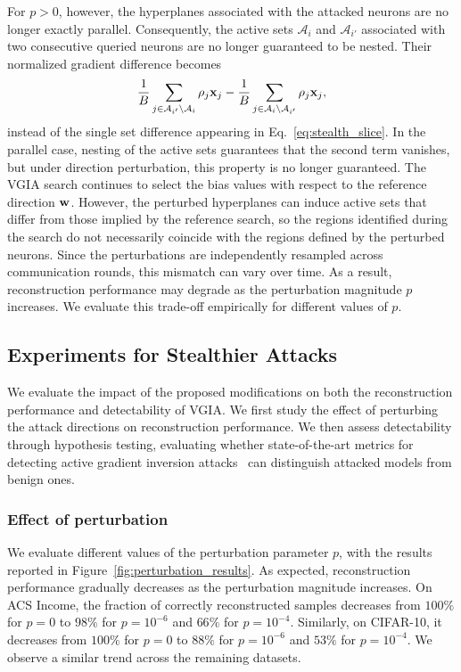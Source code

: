 For $p>0$, however, the hyperplanes associated with the attacked neurons are no longer exactly parallel. Consequently, the active sets $\mathcal A_i$ and $\mathcal A_{i'}$ associated with two consecutive queried neurons are no longer guaranteed to be nested. Their normalized gradient difference becomes
\begin{equation*}
\frac{1}{B}
\sum_{j\in\mathcal A_{i'}\setminus\mathcal A_i}
\rho_j{\mathbf{x}}_j
-
\frac{1}{B}
\sum_{j\in\mathcal A_i\setminus\mathcal A_{i'}}
\rho_j{\mathbf{x}}_j,
\end{equation*}
instead of the single set difference appearing in
Eq.~\eqref{eq:stealth_slice}. In the parallel case, nesting of the active sets guarantees that the second term vanishes, but under direction perturbation, this property is no longer guaranteed. The VGIA search continues to select the bias values with respect to the reference direction $\mathbf{w}$. However, the perturbed hyperplanes can induce active sets that differ from those implied by the reference search, so the regions
identified during the search do not necessarily coincide with the regions
defined by the perturbed neurons. Since the perturbations are independently
resampled across communication rounds, this mismatch can vary over time.
As a result, reconstruction performance may degrade as the perturbation
magnitude $p$ increases. We evaluate this trade-off empirically for different
values of $p$.

\subsection{Experiments for Stealthier Attacks}
\label{app:exp_stealthier_attack}
We evaluate the impact of the proposed modifications on both the reconstruction
performance and detectability of VGIA. We first study the effect of perturbing
the attack directions on reconstruction performance. We then assess
detectability through hypothesis testing, evaluating whether state-of-the-art
metrics for detecting active gradient inversion attacks~\cite{carletti2026detectability}
can distinguish attacked models from benign ones.

\subsubsection{Effect of perturbation}
We evaluate different values of the perturbation parameter $p$, with the
results reported in Figure~\ref{fig:perturbation_results}. As expected,
reconstruction performance gradually decreases as the perturbation magnitude
increases. On ACS Income, the fraction of correctly reconstructed samples decreases
from $100\%$ for $p=0$ to $98\%$ for $p=10^{-6}$ and $66\%$ for
$p=10^{-4}$. Similarly, on CIFAR-10, it decreases from $100\%$ for $p=0$
to $88\%$ for $p=10^{-6}$ and $53\%$ for $p=10^{-4}$. We observe a
similar trend across the remaining datasets.

